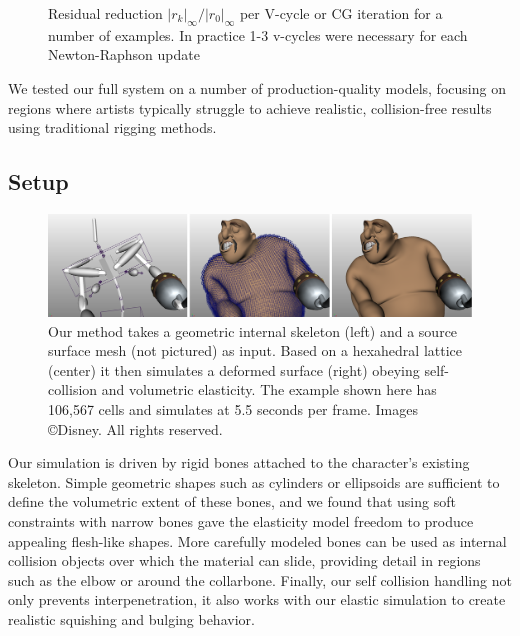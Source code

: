 \begin{figure}[tb]
\caption[Residual reduction $|r_k|_{\infty}/|r_0|_{\infty}$ per
  V-cycle or CG iteration for a number of examples.]{Residual reduction $|r_k|_{\infty}/|r_0|_{\infty}$ per
  V-cycle or CG iteration for a number of examples. In practice 1-3 v-cycles were necessary for each  Newton-Raphson update}
\label{fig:cube_convergence}
\end{figure}


We tested our full system on a number of production-quality models, focusing on regions where artists typically struggle to achieve realistic, collision-free results using traditional rigging methods.  

\subsection{Setup}
\begin{figure}[tb]
\includegraphics[width=\linewidth]{elasticity/figures/teaser3}
 \caption[The setup procedure for our method.]{Our method takes a geometric internal skeleton (left) and a source
   surface mesh (not pictured) as input. Based on a hexahedral lattice (center)
   it then simulates a deformed surface (right) obeying self-collision and volumetric
   elasticity. The example shown here has 106,567 cells and simulates at 5.5
   seconds per frame. Images \copyright Disney. All rights reserved.}\label{fig:teaser}
\end{figure}
Our simulation is driven by rigid bones attached to the character's existing skeleton.  Simple geometric shapes such as cylinders or ellipsoids are sufficient to define the volumetric extent of these bones, and we found that using soft constraints with narrow bones gave the elasticity model freedom to produce appealing flesh-like shapes. More carefully modeled bones can be used as internal collision objects over which the material can slide, providing detail in regions such as the elbow or around the collarbone. Finally, our self collision handling not only prevents interpenetration, it also works with our elastic simulation to create realistic squishing and bulging behavior.  

